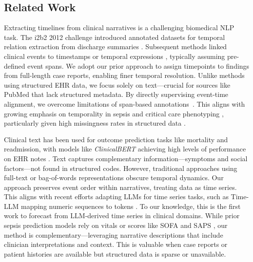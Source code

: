 \subsection{Related Work}

Extracting timelines from clinical narratives is a challenging biomedical NLP task.
The i2b2 2012 challenge introduced annotated datasets for temporal relation extraction from discharge summaries \citep{ch07:uzuner20112010}.
Subsequent methods linked clinical events to timestamps or temporal expressions \citep{leeuwenberg2020towards,ch07:frattallone2024using}, typically assuming pre-defined event spans.
We adopt our prior approach \citep{ch07:noroozizadeh2025reconstructing,noroozizadeh2025pmoa} to assign timepoints to findings from full-length case reports, enabling finer temporal resolution.
Unlike methods using structured EHR data, we focus solely on text—crucial for sources like PubMed that lack structured metadata.
By directly supervising event-time alignment, we overcome limitations of span-based annotations~\citep{rosenbloom2011data}.
This aligns with growing emphasis on temporality in sepsis and critical care phenotyping \citep{johnson2018comparative,kamran2024evaluation}, particularly given high missingness rates in structured data \citep{ch07:johnson2023mimic,seinen2025using}.

Clinical text has been used for outcome prediction tasks like mortality and readmission, with models like \textit{ClinicalBERT} achieving high levels of performance on EHR notes \citep{huang2019clinicalbert,gu2021domain}. 
Text captures complementary information—symptoms and social factors—not found in structured codes. 
However, traditional approaches using full-text or bag-of-words representations obscure temporal dynamics. 
Our approach preserves event order within narratives, treating data as time series.
This aligns with recent efforts adapting LLMs for time series tasks, such as Time-LLM mapping numeric sequences to tokens \citep{jin2023time}. 
To our knowledge, this is the first work to forecast from LLM-derived time series in clinical domains. 
While prior sepsis prediction models rely on vitals or scores like SOFA and SAPS \citep{hou2020predicting,noroozizadeh2023temporal}, our method is complementary—leveraging narrative descriptions that include clinician interpretations and context. 
This is valuable when case reports or patient histories are available but structured data is sparse or unavailable.

